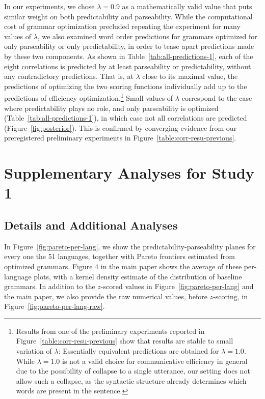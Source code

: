 \documentclass[10pt,twoside,lineno]{article}
\begin{document}
In our experiments, we chose $\lambda = 0.9$ as a mathematically valid value that puts similar weight on both predictability and parseability.
While the computational cost of grammar optimization precluded repeating the experiment for many values of $\lambda$, we also examined word order predictions for grammars optimized for only parseability or only predictability, in order to tease apart predictions made by these two components.
As shown in Table~\ref{tab:all-predictions-1}, each of the eight correlations is predicted by at least parseability or predictability, without any contradictory predictions.
That is, at $\lambda$ close to its maximal value, the predictions of optimizing the two scoring functions individually add up to the predictions of efficiency optimization.\footnote{Results from one of the preliminary experiments reported in Figure~\ref{table:corr-resu-previous} show that results are stable to small variation of $\lambda$: Essentially equivalent predictions are obtained for $\lambda=1.0$. While $\lambda=1.0$ is not a valid choice for communicative efficiency in general due to the possibility of collapse to a single utterance, our setting does not allow such a collapse, as the syntactic structure already determines which words are present in the sentence.}
Small values of $\lambda$ correspond to the case where predictability plays no role, and only parseability is optimized (Table~\ref{tab:all-predictions-1}), in which case not all correlations are predicted (Figure~\ref{fig:posterior}).
This is confirmed by converging evidence from our preregistered preliminary experiments in Figure~\ref{table:corr-resu-previous}.






\section{Supplementary Analyses for Study 1}

\subsection{Details and Additional Analyses}

In Figure~\ref{fig:pareto-per-lang}, we show the predictability-parseability planes for every one the 51 languages, together with Pareto frontiers estimated from optimized grammars.
Figure 4 in the main paper shows the average of these per-language plots, with a kernel density estimate of the distribution of baseline grammars. 
In addition to the $z$-scored values in Figure~\ref{fig:pareto-per-lang} and the main paper, we also provide the raw numerical values, before $z$-scoring, in Figure~\ref{fig:pareto-per-lang-raw}.
\end{document}
